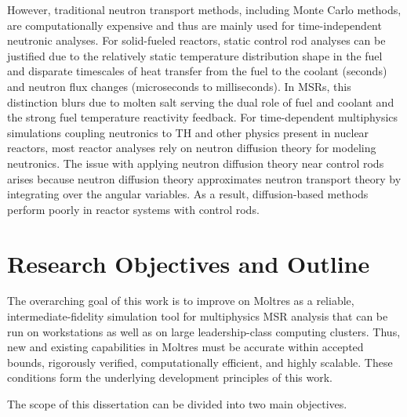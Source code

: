 However, traditional neutron transport methods, including Monte Carlo methods, are computationally expensive
and thus are mainly used for time-independent neutronic analyses. For solid-fueled reactors,
static control rod analyses can be justified due to the relatively static temperature distribution
shape in the fuel and disparate timescales of heat transfer from the fuel to
the coolant (seconds) and neutron flux changes (microseconds to milliseconds). In
\glspl{MSR}, this distinction blurs due to molten salt serving the dual role of fuel and
coolant and the strong fuel temperature reactivity feedback. For time-dependent multiphysics
simulations coupling neutronics to \gls{TH} and other physics present in nuclear reactors, most
reactor analyses rely on neutron diffusion theory for modeling neutronics. The issue with applying
neutron diffusion theory near control rods arises because neutron diffusion theory approximates
neutron transport theory by integrating over the angular variables. As a result, diffusion-based
methods perform poorly in reactor systems with control rods.


\section{Research Objectives and Outline}

The overarching goal of this work is to improve on Moltres as a reliable, intermediate-fidelity
simulation tool for multiphysics \gls{MSR} analysis that can be run on workstations as well as on
large leadership-class computing clusters. Thus, new and existing capabilities in Moltres must
be accurate within accepted bounds, rigorously verified, computationally efficient, and highly
scalable. These conditions form the underlying development principles of this work.

The scope of this dissertation can be divided into two main objectives.
%

